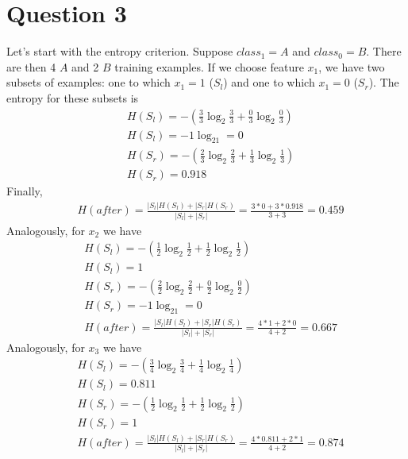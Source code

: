 \documentclass[leqno]{article}
\begin{document}
\section*{Question 3} Let's start with the entropy criterion. Suppose $class_1 = A$ and $class_0 = B$. 
There are then 4 $A$ and 2 $B$ training examples. If we choose feature $x_1$, we have two 
subsets of examples: one to which $x_1 = 1$ ($S_l$) and one to which $x_1 = 0$ ($S_r$). The entropy for these 
subsets is 
\begin{equation*}
\begin{split}
&H(S_l) = -(\frac{3}{3}\log_2\frac{3}{3} + \frac{0}{3}\log_2\frac{0}{3}) \\
&H(S_l) = -1\log_21 = 0\\
&H(S_r) = -(\frac{2}{3}\log_2\frac{2}{3} + \frac{1}{3}\log_2\frac{1}{3}) \\
&H(S_r) = 0.918
\end{split}
\end{equation*}
Finally,
\begin{equation*}
\begin{split}
&H(after) = \frac{|S_l|H(S_l) + |S_r|H(S_r)}{|S_l| + |S_r|} = \frac{3*0 + 3*0.918}{3 + 3} = 0.459
\end{split}
\end{equation*} 
Analogously, for $x_2$ we have
\begin{equation*}
\begin{split}
&H(S_l) = -(\frac{1}{2}\log_2\frac{1}{2} + \frac{1}{2}\log_2\frac{1}{2}) \\
&H(S_l) = 1\\
&H(S_r) = -(\frac{2}{2}\log_2\frac{2}{2} + \frac{0}{2}\log_2\frac{0}{2})\\
&H(S_r) = -1\log_21 = 0\\
&H(after) = \frac{|S_l|H(S_l) + |S_r|H(S_r)}{|S_l| + |S_r|} = \frac{4*1 + 2*0}{4 + 2} = 0.667
\end{split}
\end{equation*}
Analogously, for $x_3$ we have
\begin{equation*}
\begin{split}
&H(S_l) = -(\frac{3}{4}\log_2\frac{3}{4} + \frac{1}{4}\log_2\frac{1}{4}) \\
&H(S_l) = 0.811\\
&H(S_r) = -(\frac{1}{2}\log_2\frac{1}{2} + \frac{1}{2}\log_2\frac{1}{2})\\
&H(S_r) = 1\\
&H(after) = \frac{|S_l|H(S_l) + |S_r|H(S_r)}{|S_l| + |S_r|} = \frac{4*0.811 + 2*1}{4 + 2} = 0.874
\end{split}
\end{equation*}
\end{document}
